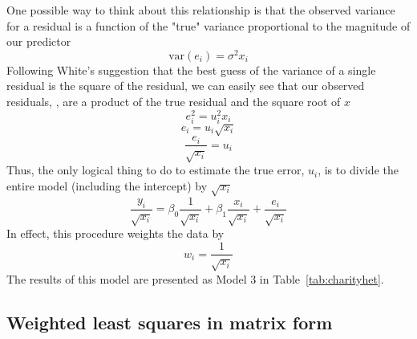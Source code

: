 One possible way to think about this relationship is that the observed variance for a residual is a function of the "true" variance proportional to the magnitude of our predictor
\[
\mbox{var}\left(e_i\right)=\sigma^2x_i
\]
Following White's suggestion that the best guess of the variance of a single residual is the square of the residual, we can easily see that our observed residuals, , are a product of the true residual and the square root of $x$
\begin{equation}
e_i^2=u_i^2x_i
\end{equation}
\[
e_i=u_i\sqrt{x_i}
\]
\[
\frac{e_i}{\sqrt{x_i}}=u_i
\]
Thus, the only logical thing to do to estimate the true error, $u_i$, is to divide the entire model (including the intercept) by $\sqrt{x_i}$
\begin{equation}
\frac{y_i}{\sqrt{x_i}}=\beta_0\frac{1}{\sqrt{x_i}}+\beta_1\frac{x_i}{\sqrt{x_i}}+\frac{e_i}{\sqrt{x_i}}
\end{equation}
In effect, this procedure weights the data by
\begin{equation}
w_i=\frac{1}{\sqrt{x_i}}
\end{equation}
The results of this model are presented as Model 3 in Table~\ref{tab:charityhet}.

\subsection{Weighted least squares in matrix form}

